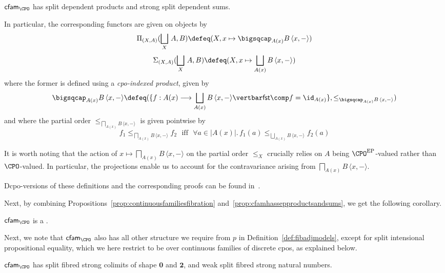 \begin{proposition}
\label{prop:cfamhassepproductsandsums}
$\mathsf{cfam}_{\CPO}$ has split dependent products and strong split dependent sums.
\end{proposition}

In particular, the corresponding functors are given on objects by 
\[
\Pi_{(X,A)}(\bigsqcup_{X}\, A , B) \defeq (X , x \mapsto \bigsqcap_{A(x)} B\, \langle x , - \rangle)
\]
\[
\Sigma_{(X,A)}(\bigsqcup_{X}\, A , B) \defeq (X , x \mapsto \bigsqcup_{A(x)} B\, \langle x , - \rangle)
\]
where the former is defined using a \emph{cpo-indexed product}, given by
\[
\bigsqcap_{A(x)} B\, \langle x , - \rangle \defeq (\{f : A(x) \longrightarrow \bigsqcup_{A(x)} B\, \langle x , - \rangle \vertbar \mathsf{fst} \comp f = \id_{A(x)}\} , \leq_{\bigsqcap_{A(x)} B\, \langle x , - \rangle})
\]
and where the partial order $\leq_{\bigsqcap_{A(x)} B\, \langle x , - \rangle}$ is given pointwise by
\[
f_1 \leq_{\bigsqcap_{A(x)} B\, \langle x , - \rangle} f_2 \text{~~iff~~} \forall a \in \vert A(x) \vert .\, f_1(a) \leq_{\bigsqcup_{A(x)} B\, \langle x , - \rangle} f_2(a)
\]

It is worth noting that the action of $x \mapsto \bigsqcap_{A(x)} B\, \langle x , - \rangle$ on the partial order $\leq_X$ crucially relies on $A$ being $\CPO^{\text{EP}}$-valued rather than $\CPO$-valued. In particular, the projections enable us to account for the contravariance arising from $\bigsqcap_{A(x)} B\, \langle x , - \rangle$. 

Dcpo-versions of these definitions and the corresponding proofs can be found in~\cite[Section~10.6]{Jacobs:Book}. 

Next, by combining Propositions~\ref{prop:continuousfamiliesfibration} and~\ref{prop:cfamhassepproductsandsums}, we get the following corollary.

\begin{corollary}
$\mathsf{cfam}_{\CPO}$ is a \SCCompC.
\end{corollary}

Next, we note that $\mathsf{cfam}_{\CPO}$ also has all other structure we require from $p$ in Definition~\ref{def:fibadjmodels}, except for split intensional propositional equality, which we here restrict to be over continuous families of discrete cpos, as explained below.

\begin{proposition}
$\mathsf{cfam}_{\CPO}$ has split fibred strong colimits of shape $\mathbf{0}$ and $\mathbf{2}$, and weak split fibred strong natural numbers.
\end{proposition}

